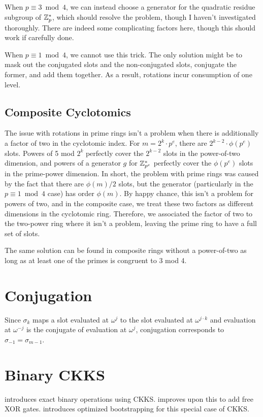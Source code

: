 \documentclass[../fheimpl.tex]{subfiles}
\begin{document}
When $p\equiv 3\bmod 4$, we can instead choose a generator for the quadratic residue subgroup of $\mathbb{Z}_p^*$, which should resolve the problem, though I haven't investigated thoroughly. There are indeed some complicating factors here, though this should work if carefully done.

When $p\equiv 1 \bmod 4$, we cannot use this trick. The only solution might be to mask out the conjugated slots and the non-conjugated slots, conjugate the former, and add them together. As a result, rotations incur consumption of one level.

\subsection{Composite Cyclotomics}
The issue with rotations in prime rings isn't a problem when there is additionally a factor of two in the cyclotomic index. For $m=2^k\cdot p^e$, there are $2^{k-2}\cdot \phi(p^e)$ slots. Powers of 5 mod $2^k$ perfectly cover the $2^{k-2}$ slots in the power-of-two dimension, and powers of a generator $g$ for $\mathbb{Z}_{p^e}^*$ perfectly cover the $\phi(p^e)$ slots in the prime-power dimension. In short, the problem with prime rings was caused by the fact that there are $\phi(m)/2$ slots, but the generator (particularly in the $p\equiv 1\bmod 4$ case) has order $\phi(m)$. By happy chance, this isn't a problem for powers of two, and in the composite case, we treat these two factors as different dimensions in the cyclotomic ring. Therefore, we associated the factor of two to the two-power ring where it isn't a problem, leaving the prime ring to have a full set of slots.

The same solution can be found in composite rings without a power-of-two as long as at least one of the primes is congruent to 3 mod 4.

\section{Conjugation}
Since $\sigma_k$ maps a slot evaluated at $\omega^j$ to the slot evaluated at $\omega^{j\cdot k}$ and evaluation at $\omega^{-j}$ is the conjugate of evaluation at $\omega^j$, conjugation corresponds to $\sigma_{-1}=\sigma_{m-1}$.

\section{Binary CKKS}
    \cite{cryptoeprint:2022/1298} introduces exact binary operations using CKKS. \cite{cryptoeprint:2025/074} improves upon this to add free XOR gates. \cite{cryptoeprint:2024/767} introduces optimized bootstrapping for this special case of CKKS.
    

\ifcompileasbook
\else
    \printbibliography
\fi
	
\end{document}
